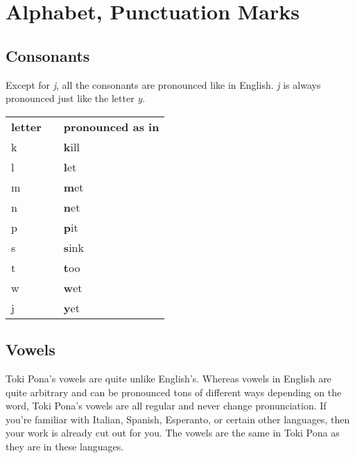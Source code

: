 \label{'pronunciation_alphabet'}
\section{Alphabet, Punctuation Marks}
%
\subsection*{Consonants}
%
Except for \textit{j}, all the consonants are pronounced like in English. 
\textit{j} is always pronounced just like the letter \textit{y}. 

\begin{supertabular}{p{2cm}|ll}
\textbf{letter}   &&    \textbf{pronounced as in} \\ %
k && \textbf{k}ill  \\ %
l && \textbf{l}et   \\ %
m && \textbf{m}et   \\ %
n && \textbf{n}et   \\ %
p && \textbf{p}it   \\ %
s && \textbf{s}ink  \\ %
t && \textbf{t}oo   \\ %
w && \textbf{w}et   \\ %
j && \textbf{y}et   \\ %
\end{supertabular} 

\subsection*{Vowels}
%
Toki Pona's vowels are quite unlike English's. 
Whereas vowels in English are quite arbitrary and can be pronounced tons of different ways depending on the word, Toki Pona's vowels are all regular and never change pronunciation. 
If you're familiar with Italian, Spanish, Esperanto, or certain other languages, then your work is already cut out for you. 
The vowels are the same in Toki Pona as they are in these languages. 

